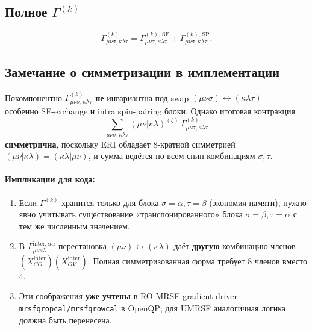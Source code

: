\documentclass[11pt, a4paper]{article}
\theoremstyle{definition}
\begin{document}
\subsection{Полное $\Gamma^{(k)}$}

\begin{equation}
    \Gamma^{(k)}_{\mu\nu\sigma, \kappa\lambda\tau} = \Gamma^{(k),\,\text{SF}}_{\mu\nu\sigma, \kappa\lambda\tau} + \Gamma^{(k),\,\text{SP}}_{\mu\nu\sigma, \kappa\lambda\tau}.
    \label{eq:Gamma}
\end{equation}

\subsection{Замечание о симметризации в имплементации}

Покомпонентно $\Gamma^{(k)}_{\mu\nu\sigma, \kappa\lambda\tau}$ \textbf{не} инвариантна под swap $(\mu\nu\sigma) \leftrightarrow (\kappa\lambda\tau)$ --- особенно SF-exchange и intra spin-pairing блоки. Однако итоговая контракция
$$
\sum_{\mu\nu\sigma, \kappa\lambda\tau} (\mu\nu | \kappa\lambda)^{(\xi)}\, \Gamma^{(k)}_{\mu\nu\sigma, \kappa\lambda\tau}
$$
\textbf{симметрична}, поскольку ERI обладает 8-кратной симметрией $(\mu\nu | \kappa\lambda) = (\kappa\lambda | \mu\nu)$, и сумма ведётся по всем спин-комбинациям $\sigma, \tau$.

\paragraph{Импликации для кода:}
\begin{enumerate}
    \item Если $\Gamma^{(k)}$ хранится только для блока $\sigma = \alpha, \tau = \beta$ (экономия памяти), нужно явно учитывать существование «транспонированного» блока $\sigma = \beta, \tau = \alpha$ с тем же численным значением.
    \item В $\Gamma^{\text{inter},\alpha\alpha}_{\mu\nu\kappa\lambda}$ перестановка $(\mu\nu) \leftrightarrow (\kappa\lambda)$ даёт \textbf{другую} комбинацию членов $(X^{\text{inter}}_{CO})(X^{\text{inter}}_{OV})$. Полная симметризованная форма требует 8 членов вместо 4.
    \item Эти соображения \textbf{уже учтены} в RO-MRSF gradient driver \texttt{mrsfqropcal/mrsfqrowcal} в OpenQP; для UMRSF аналогичная логика должна быть перенесена.
\end{enumerate}

\end{document}
